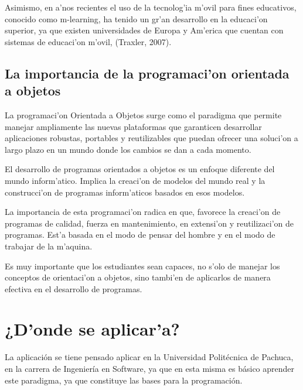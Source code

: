 Asimismo, en a'nos recientes el uso de la tecnolog'ia m'ovil para fines educativos, conocido como m-learning, ha tenido un gr'an desarrollo en la educaci'on superior, ya que existen universidades de Europa y Am'erica que cuentan con sistemas de educaci'on m'ovil, (Traxler, 2007).

\subsection{La importancia de la programaci'on orientada a objetos}
La programaci'on Orientada a Objetos surge como el paradigma que permite manejar ampliamente las nuevas plataformas que garanticen desarrollar aplicaciones robustas, portables y reutilizables que puedan ofrecer una soluci'on a largo plazo en un mundo donde los cambios se dan a cada momento.

El desarrollo de programas orientados a objetos es un enfoque diferente del mundo inform'atico. Implica la creaci'on de modelos del mundo real y la construcci'on de programas inform'aticos basados en esos modelos.

La importancia de esta programaci'on radica en que, favorece la creaci'on de programas de calidad, fuerza en mantenimiento, en extensi'on y reutilizaci'on de programas. Est'a basada en el modo de pensar del hombre y en el modo de trabajar de la m'aquina.

Es muy importante que los estudiantes sean capaces, no s'olo de manejar los conceptos de orientaci'on a objetos, sino tambi'en de aplicarlos de manera efectiva en el desarrollo de programas.

\section{¿D'onde se aplicar'a?}
La aplicación se tiene pensado aplicar en la Universidad Politécnica de Pachuca, en la carrera de Ingeniería en Software, ya que en esta misma es básico aprender este paradigma, ya que constituye las bases para la programación.